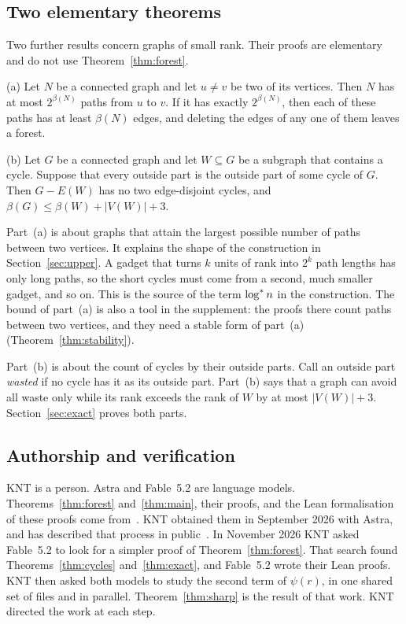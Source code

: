 \subsection{Two elementary theorems}

Two further results concern graphs of small rank. Their proofs are elementary and do not use
Theorem~\ref{thm:forest}.

\begin{theorem}\label{thm:exact}
\textup{(a)} Let $N$ be a connected graph and let $u\ne v$ be two of its vertices. Then $N$ has at
most $2^{\beta(N)}$ paths from $u$ to $v$. If it has exactly $2^{\beta(N)}$, then each of these paths
has at least $\beta(N)$ edges, and deleting the edges of any one of them leaves a forest.

\textup{(b)} Let $G$ be a connected graph and let $W\subseteq G$ be a subgraph that contains a cycle.
Suppose that every outside part is the outside part of some cycle of $G$. Then $G-E(W)$ has no two
edge-disjoint cycles, and $\beta(G)\le\beta(W)+|V(W)|+3$.
\end{theorem}

Part~(a) is about graphs that attain the largest possible number of paths between two vertices. It
explains the shape of the construction in Section~\ref{sec:upper}. A gadget that turns $k$ units of
rank into $2^{k}$ path lengths has only long paths, so the short cycles must come from a second,
much smaller gadget, and so on. This is the source of the term $\log^{*} n$ in the construction. The
bound of part~(a) is also a tool in the supplement: the proofs there count paths between two
vertices, and they need a stable form of part~(a) (Theorem~\ref{thm:stability}).

Part~(b) is about the count of cycles by their outside parts. Call an outside part \emph{wasted} if
no cycle has it as its outside part. Part~(b) says that a graph can avoid all waste only while its
rank exceeds the rank of $W$ by at most $|V(W)|+3$. Section~\ref{sec:exact} proves both parts.

\subsection{Authorship and verification}\label{sec:status}

KNT is a person. Astra and Fable~5.2 are language models. Theorems~\ref{thm:forest}
and~\ref{thm:main}, their proofs, and the Lean formalisation of these proofs come
from~\cite{KNT}. KNT obtained them in September 2026 with Astra, and has described that process in
public~\cite{Claim}. In November 2026 KNT asked Fable~5.2 to look for a simpler proof of
Theorem~\ref{thm:forest}. That search found Theorems~\ref{thm:cycles} and~\ref{thm:exact}, and
Fable~5.2 wrote their Lean proofs. KNT then asked both models to study the second term of
$\psi(r)$, in one shared set of files and in parallel. Theorem~\ref{thm:sharp} is the result of
that work. KNT directed the work at each step.

